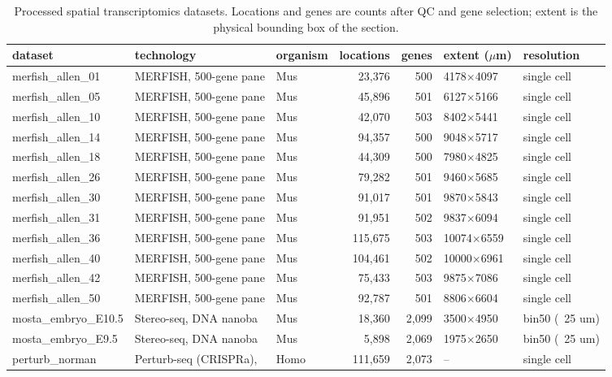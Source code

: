 \begin{table}[htbp]
\centering
\footnotesize
\setlength{\tabcolsep}{3pt}
\caption{Processed spatial transcriptomics datasets. Locations and genes are counts after QC and gene selection; extent is the physical bounding box of the section.}
\label{tab:datasets}
\begin{tabular}{lllrrll}
\toprule
dataset & technology & organism & locations & genes & extent ($\mu$m) & resolution\\
\midrule
merfish\_allen\_01 & MERFISH, 500-gene pane & Mus & 23,376 & 500 & 4178$\times$4097 & single cell \\
merfish\_allen\_05 & MERFISH, 500-gene pane & Mus & 45,896 & 501 & 6127$\times$5166 & single cell \\
merfish\_allen\_10 & MERFISH, 500-gene pane & Mus & 42,070 & 503 & 8402$\times$5441 & single cell \\
merfish\_allen\_14 & MERFISH, 500-gene pane & Mus & 94,357 & 500 & 9048$\times$5717 & single cell \\
merfish\_allen\_18 & MERFISH, 500-gene pane & Mus & 44,309 & 500 & 7980$\times$4825 & single cell \\
merfish\_allen\_26 & MERFISH, 500-gene pane & Mus & 79,282 & 501 & 9460$\times$5685 & single cell \\
merfish\_allen\_30 & MERFISH, 500-gene pane & Mus & 91,017 & 501 & 9870$\times$5843 & single cell \\
merfish\_allen\_31 & MERFISH, 500-gene pane & Mus & 91,951 & 502 & 9837$\times$6094 & single cell \\
merfish\_allen\_36 & MERFISH, 500-gene pane & Mus & 115,675 & 503 & 10074$\times$6559 & single cell \\
merfish\_allen\_40 & MERFISH, 500-gene pane & Mus & 104,461 & 502 & 10000$\times$6961 & single cell \\
merfish\_allen\_42 & MERFISH, 500-gene pane & Mus & 75,433 & 503 & 9875$\times$7086 & single cell \\
merfish\_allen\_50 & MERFISH, 500-gene pane & Mus & 92,787 & 501 & 8806$\times$6604 & single cell \\
mosta\_embryo\_E10.5 & Stereo-seq, DNA nanoba & Mus & 18,360 & 2,099 & 3500$\times$4950 & bin50 (~25 um) \\
mosta\_embryo\_E9.5 & Stereo-seq, DNA nanoba & Mus & 5,898 & 2,069 & 1975$\times$2650 & bin50 (~25 um) \\
perturb\_norman & Perturb-seq (CRISPRa), & Homo & 111,659 & 2,073 & -- & single cell \\

\end{tabular}
\end{table}
